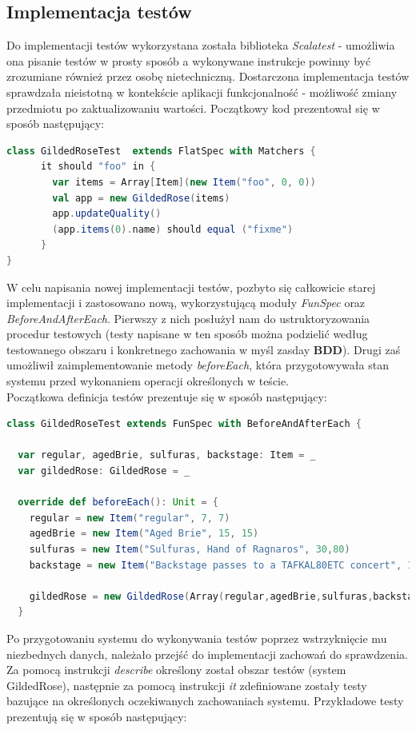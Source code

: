 \documentclass[a4paper, 11pt]{article}
\begin{document}
\subsection{Implementacja testów}
Do implementacji testów wykorzystana została biblioteka \textit{Scalatest} - umożliwia ona pisanie testów w prosty sposób a wykonywane instrukcje powinny być zrozumiane również przez osobę nietechniczną. Dostarczona implementacja testów sprawdzała nieistotną w kontekście aplikacji funkcjonalność - możliwość zmiany przedmiotu po zaktualizowaniu wartości.
Początkowy kod prezentował się w sposób następujący:
\begin{lstlisting}[language=scala]
 class GildedRoseTest  extends FlatSpec with Matchers {
      it should "foo" in {
        var items = Array[Item](new Item("foo", 0, 0))
        val app = new GildedRose(items)
        app.updateQuality()
        (app.items(0).name) should equal ("fixme")
      }
}
\end{lstlisting}
W celu napisania nowej implementacji testów, pozbyto się całkowicie starej implementacji i zastosowano nową, wykorzystującą moduły \textit{FunSpec} oraz \textit{BeforeAndAfterEach}. Pierwszy z nich posłużył nam do ustruktoryzowania procedur testowych (testy napisane w ten sposób można podzielić według testowanego obszaru i konkretnego zachowania w myśl zasday \textbf{BDD}). Drugi zaś umożliwił zaimplementowanie metody \textit{beforeEach}, która przygotowywała stan systemu przed wykonaniem operacji określonych w teście.\\
Początkowa definicja testów prezentuje się w sposób następujący:
\begin{lstlisting}[language=scala]
class GildedRoseTest extends FunSpec with BeforeAndAfterEach {

  var regular, agedBrie, sulfuras, backstage: Item = _
  var gildedRose: GildedRose = _

  override def beforeEach(): Unit = {
    regular = new Item("regular", 7, 7)
    agedBrie = new Item("Aged Brie", 15, 15)
    sulfuras = new Item("Sulfuras, Hand of Ragnaros", 30,80)
    backstage = new Item("Backstage passes to a TAFKAL80ETC concert", 11, 9)

    gildedRose = new GildedRose(Array(regular,agedBrie,sulfuras,backstage))
  }
\end{lstlisting}
Po przygotowaniu systemu do wykonywania testów poprzez wstrzyknięcie mu niezbednych danych, należało przejść do implementacji zachowań do sprawdzenia.
Za pomocą instrukcji \textit{describe} określony został obszar testów (system GildedRose), następnie za pomocą instrukcji \textit{it} zdefiniowane zostały testy bazujące na określonych oczekiwanych zachowaniach systemu. Przykładowe testy prezentują się w sposób następujący:
\end{document}
